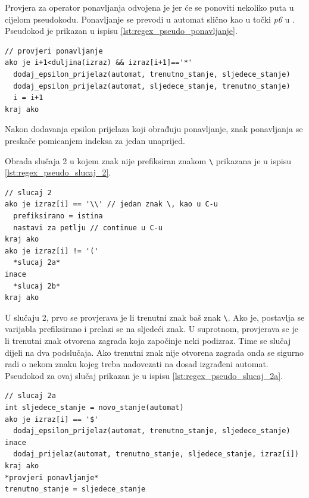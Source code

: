 \documentclass[times, 12pt, utf8]{book}
\begin{document}
Provjera za operator ponavljanja odvojena je jer će se ponoviti nekoliko puta u cijelom pseudokodu.
Ponavljanje se prevodi u automat slično kao u točki \emph{p6} u \cite[poglavlje 2.2.2]{utr}.
Pseudokod je prikazan u ispisu \ref{lst:regex_pseudo_ponavljanje}.

\begin{lstlisting}[caption={Obrada ponavljanja Kleeneovim operatorom.},label=lst:regex_pseudo_ponavljanje]
// provjeri ponavljanje
ako je i+1<duljina(izraz) && izraz[i+1]=='*'
  dodaj_epsilon_prijelaz(automat, trenutno_stanje, sljedece_stanje)
  dodaj_epsilon_prijelaz(automat, sljedece_stanje, trenutno_stanje)
  i = i+1
kraj ako
\end{lstlisting}

Nakon dodavanja epsilon prijelaza koji obrađuju ponavljanje, znak ponavljanja se preskače pomicanjem indeksa za jedan unaprijed.

Obrada slučaja 2 u kojem znak nije prefiksiran znakom \verb|\| prikazana je u ispisu \ref{lst:regex_pseudo_slucaj_2}.

\begin{lstlisting}[caption={Slučaj 2 u funkciji \texttt{pretvori}.},label=lst:regex_pseudo_slucaj_2]
// slucaj 2
ako je izraz[i] == '\\' // jedan znak \, kao u C-u
  prefiksirano = istina
  nastavi za petlju // continue u C-u
kraj ako
ako je izraz[i] != '('
  *slucaj 2a*
inace
  *slucaj 2b*
kraj ako
\end{lstlisting}

U slučaju 2, prvo se provjerava je li trenutni znak baš znak \verb|\|.
Ako je, postavlja se varijabla prefiksirano i prelazi se na sljedeći znak.
U suprotnom, provjerava se je li trenutni znak otvorena zagrada koja započinje neki podizraz.
Time se slučaj dijeli na dva podslučaja.
Ako trenutni znak nije otvorena zagrada onda se sigurno radi o nekom znaku kojeg treba nadovezati na dosad izgrađeni automat.
Pseudokod za ovaj slučaj prikazan je u ispisu \ref{lst:regex_pseudo_slucaj_2a}.

\begin{lstlisting}[caption={Slučaj 2a u funkciji \texttt{pretvori}.},label=lst:regex_pseudo_slucaj_2a]
// slucaj 2a
int sljedece_stanje = novo_stanje(automat)
ako je izraz[i] == '$'
  dodaj_epsilon_prijelaz(automat, trenutno_stanje, sljedece_stanje)
inace
  dodaj_prijelaz(automat, trenutno_stanje, sljedece_stanje, izraz[i])
kraj ako
*provjeri ponavljanje*
trenutno_stanje = sljedece_stanje
\end{lstlisting}
\end{document}
